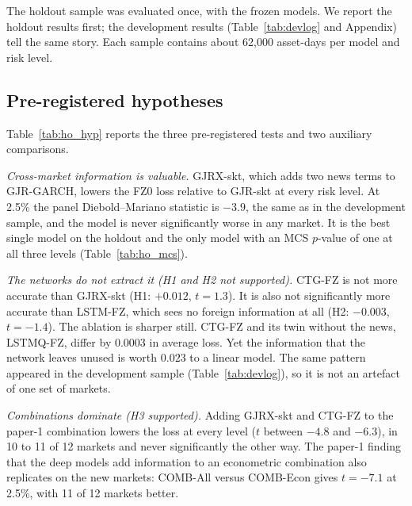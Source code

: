 The holdout sample was evaluated once, with the frozen models. We report the holdout results first; the development results (Table~\ref{tab:devlog} and Appendix) tell the same story. Each sample contains about 62{,}000 asset-days per model and risk level.

\subsection{Pre-registered hypotheses}
Table~\ref{tab:ho_hyp} reports the three pre-registered tests and two auxiliary comparisons.

\emph{Cross-market information is valuable.} GJRX-skt, which adds two news terms to GJR-GARCH, lowers the FZ0 loss relative to GJR-skt at every risk level. At 2.5\% the panel Diebold--Mariano statistic is $-3.9$, the same as in the development sample, and the model is never significantly worse in any market. It is the best single model on the holdout and the only model with an MCS $p$-value of one at all three levels (Table~\ref{tab:ho_mcs}).

\emph{The networks do not extract it (H1 and H2 not supported).} CTG-FZ is not more accurate than GJRX-skt (H1: $+0.012$, $t=1.3$). It is also not significantly more accurate than LSTM-FZ, which sees no foreign information at all (H2: $-0.003$, $t=-1.4$). The ablation is sharper still. CTG-FZ and its twin without the news, LSTMQ-FZ, differ by $0.0003$ in average loss. Yet the information that the network leaves unused is worth $0.023$ to a linear model. The same pattern appeared in the development sample (Table~\ref{tab:devlog}), so it is not an artefact of one set of markets.

\emph{Combinations dominate (H3 supported).} Adding GJRX-skt and CTG-FZ to the paper-1 combination lowers the loss at every level ($t$ between $-4.8$ and $-6.3$), in 10 to 11 of 12 markets and never significantly the other way. The paper-1 finding that the deep models add information to an econometric combination also replicates on the new markets: COMB-All versus COMB-Econ gives $t=-7.1$ at 2.5\%, with 11 of 12 markets better.



